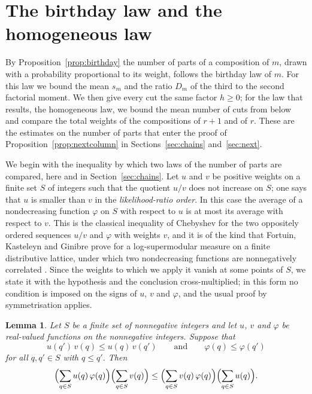 \documentclass{amsart}
\makeatletter
\newtheorem{lemma}[theorem]{Lemma}
\theoremstyle{definition}
\theoremstyle{remark}
\numberwithin{equation}{section}
\def\subsection{\@startsection{subsection}{2}\z@{.5\linespacing\@plus.7\linespacing}{-.5em}{\normalfont\bfseries\boldmath}}
\makeatother
\begin{document}
\section{The birthday law and the homogeneous law}\label{sec:birthday}
By Proposition~\ref{prop:birthday} the number of parts of a composition of $m$, drawn with a probability proportional to its weight, follows the birthday law of $m$. For this law we bound the mean $s_m$ and the ratio $D_m$ of the third to the second factorial moment. We then give every cut the same factor $h\ge 0$; for the law that results, the homogeneous law, we bound the mean number of cuts from below and compare the total weights of the compositions of $r+1$ and of $r$. These are the estimates on the number of parts that enter the proof of Proposition~\ref{prop:nextcolumn} in Sections~\ref{sec:chains} and~\ref{sec:next}.

\subsection{A correlation inequality}\label{subsec:birthday-correlation}

We begin with the inequality by which two laws of the number of parts are compared, here and in Section~\ref{sec:chains}. Let $u$ and $v$ be positive weights on a finite set $S$ of integers such that the quotient $u/v$ does not increase on $S$; one says that $u$ is smaller than $v$ in the \emph{likelihood-ratio order}. In this case the average of a nondecreasing function $\varphi$ on $S$ with respect to $u$ is at most its average with respect to $v$. This is the classical inequality of Chebyshev for the two oppositely ordered sequences $u/v$ and $\varphi$ with weights $v$, and it is of the kind that Fortuin, Kasteleyn and Ginibre prove for a log-supermodular measure on a finite distributive lattice, under which two nondecreasing functions are nonnegatively correlated \cite[Proposition~1]{fortuin1971}. Since the weights to which we apply it vanish at some points of $S$, we state it with the hypothesis and the conclusion cross-multiplied; in this form no condition is imposed on the signs of $u$, $v$ and $\varphi$, and the usual proof by symmetrisation applies.

\begin{lemma}\label{lem:chebyshev}
Let $S$ be a finite set of nonnegative integers and let $u$, $v$ and $\varphi$ be real-valued functions on the nonnegative integers. Suppose that
\[
u(q')\,v(q)\le u(q)\,v(q')\qquad\text{and}\qquad\varphi(q)\le\varphi(q')
\]
for all $q,q'\in S$ with $q\le q'$. Then
\[
\Bigl(\sum_{q\in S}u(q)\,\varphi(q)\Bigr)\Bigl(\sum_{q\in S}v(q)\Bigr)\le\Bigl(\sum_{q\in S}v(q)\,\varphi(q)\Bigr)\Bigl(\sum_{q\in S}u(q)\Bigr).
\]
\end{lemma}
\end{document}
